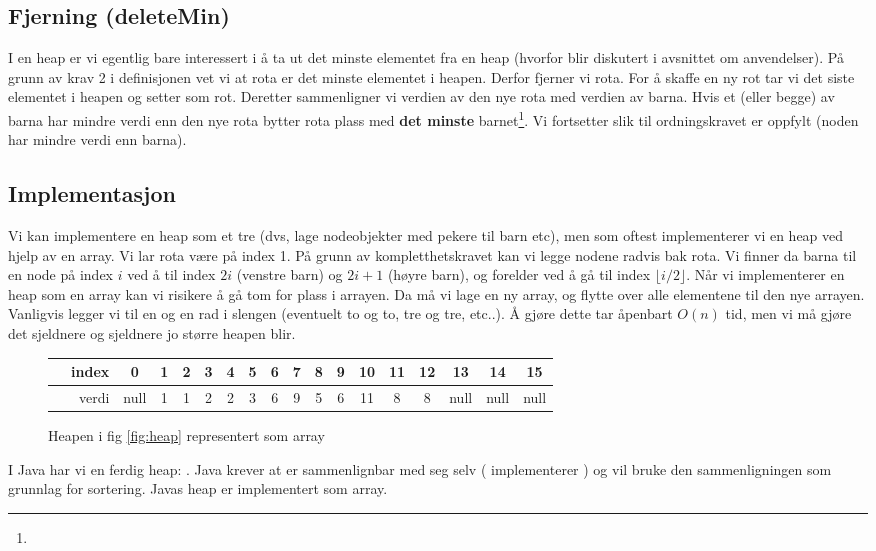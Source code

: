 \subsection{Fjerning (deleteMin)}
I en heap er vi egentlig bare interessert i å ta ut det minste elementet fra en heap (hvorfor blir diskutert i avsnittet om anvendelser). På grunn av krav 2 i definisjonen vet vi at rota er det minste elementet i heapen. Derfor fjerner vi rota. For å skaffe en ny rot tar vi det siste elementet i heapen og setter som rot. Deretter sammenligner vi verdien av den nye rota med verdien av barna. Hvis et (eller begge) av barna har mindre verdi enn den nye rota bytter rota plass med \textbf{det minste} barnet\footnote{}. Vi fortsetter slik til ordningskravet er oppfylt (noden har mindre verdi enn barna). 


\subsection{Implementasjon}
Vi kan implementere en heap som et tre (dvs, lage nodeobjekter med pekere til barn etc), men som oftest implementerer vi en heap ved hjelp av en array. Vi lar rota være på index 1. På grunn av kompletthetskravet kan vi legge nodene radvis bak rota. Vi finner da barna til en node på index $ i $ ved å til index $ 2i $ (venstre barn) og $ 2i+1 $ (høyre barn), og forelder ved å gå til index $ \lfloor i/2 \rfloor $. Når vi implementerer en heap som en array kan vi risikere å gå tom for plass i arrayen. Da må vi lage en ny array, og flytte over alle elementene til den nye arrayen. Vanligvis legger vi til en og en rad i slengen (eventuelt to og to, tre og tre, etc..). Å gjøre dette tar åpenbart $ O(n) $ tid, men vi må gjøre det sjeldnere og sjeldnere jo større heapen blir. 

\begin{figure}[h!]
\centering
\caption{Heapen i fig \ref{fig:heap} representert som array}
\begin{scriptsize}
\begin{tabular}{r||c|c|c|c|c|c|c|c|c|c|c|c|c|c|c|c}
	~~index &  0   & 1 & 2 & 3 & 4 & 5 & 6 & 7 & 8 & 9 & 10 & 11 & 12 &  13  &  14  &  15  \\ \hline
	~~verdi & null & 1 & 1 & 2 & 2 & 3 & 6 & 9 & 5 & 6 & 11 & 8  & 8  & null & null & null 
\end{tabular}
\end{scriptsize}
\end{figure}

I Java har vi en ferdig heap: . Java krever at  er sammenlignbar med seg selv ( implementerer ) og vil bruke den sammenligningen som grunnlag for sortering. Javas heap er implementert som array. 

